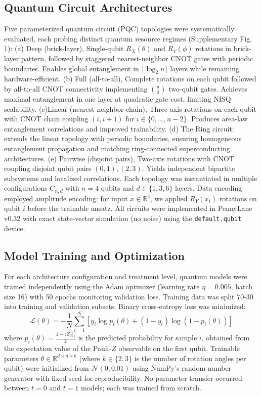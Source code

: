 \documentclass[
    reprint,
    amsmath, amssymb,
    aps,
    floatfix,
    nofootinbib
]{revtex4-1}
\begin{document}
\subsection*{Quantum Circuit Architectures}

Five parameterized quantum circuit (PQC) topologies were systematically evaluated, each probing distinct quantum resource regimes (Supplementary Fig. 1):
(a) Deep (brick-layer), Single-qubit $R_X(\theta)$ and $R_Y(\phi)$ rotations in brick-layer pattern, followed by staggered nearest-neighbor CNOT gates with periodic boundaries. Enables global entanglement in $\lceil \log_2 n \rceil$ layers while remaining hardware-efficient. (b) Full (all-to-all), Complete rotations on each qubit followed by all-to-all CNOT connectivity implementing $\binom{n}{2}$ two-qubit gates. Achieves maximal entanglement in one layer at quadratic gate cost, limiting NISQ scalability.
(c)Linear (nearest-neighbor chain), Three-axis rotations on each qubit with CNOT chain coupling $(i, i+1)$ for $i \in \{0, \ldots, n-2\}$. Produces area-law entanglement correlations and improved trainability.
(d) The Ring circuit:  extends the linear topology with periodic boundaries, ensuring homogeneous entanglement propagation and matching ring-connected superconducting architectures. (e) Pairwise (disjoint pairs), Two-axis rotations with CNOT coupling disjoint qubit pairs $(0,1), (2,3)$. Yields independent bipartite subsystems and localized correlations. Each topology was instantiated in multiple configurations $C_{n,d}$ with $n=4$ qubits and $d \in \{1, 3, 6\}$ layers. Data encoding employed amplitude encoding: for input $x \in \mathbb{R}^4$, we applied $R_Y(x_i)$ rotations on qubit $i$ before the trainable ansatz. All circuits were implemented in PennyLane v0.32 with exact state-vector simulation (no noise) using the \texttt{default.qubit} device.

\subsection*{Model Training and Optimization}

For each architecture configuration and treatment level, quantum models were trained independently using the Adam optimizer (learning rate $\eta=0.005$, batch size 16) with 50 epochs monitoring validation loss. Training data was split 70-30 into training and validation subsets. Binary cross-entropy loss was minimized:
\begin{equation}
\mathcal{L}(\theta) = -\frac{1}{N} \sum_{i=1}^N \left[ y_i \log p_i(\theta) + (1-y_i) \log(1-p_i(\theta)) \right]
\end{equation}
where $p_i(\theta) = \frac{1 - \langle Z_0 \rangle_i}{2}$ is the predicted probability for sample $i$, obtained from the expectation value of the Pauli-$Z$ observable on the first qubit.
Trainable parameters $\theta \in \mathbb{R}^{d \times n \times k}$ (where $k \in \{2,3\}$ is the number of rotation angles per qubit) were initialized from $\mathcal{N}(0, 0.01)$ using NumPy's random number generator with fixed seed for reproducibility. No parameter transfer occurred between $t=0$ and $t=1$ models; each was trained from scratch.
\end{document}
